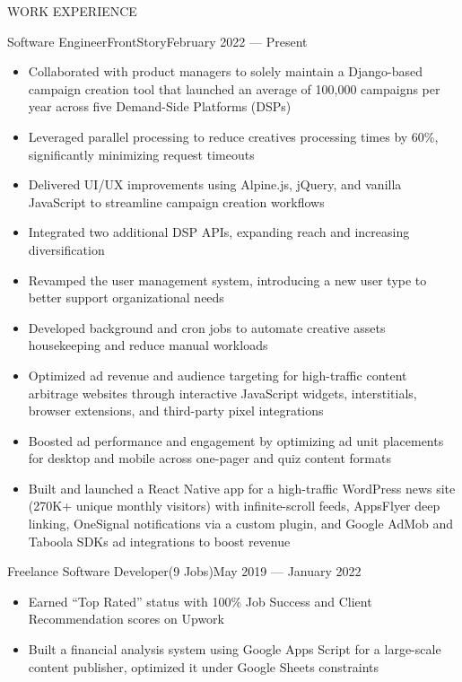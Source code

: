 \documentclass[]{mcdowellcv}
\begin{document}
	\makeheader
	
	
	\begin{cvsection}{WORK EXPERIENCE}
		\begin{cvsubsection}{Software Engineer}{FrontStory}{February 2022 — Present}
			\begin{itemize}
				\item Collaborated with product managers to solely maintain a Django-based campaign creation tool that launched an average of 100,000 campaigns per year across five Demand-Side Platforms (DSPs)
				\item Leveraged parallel processing to reduce creatives processing times by 60\%, significantly minimizing request timeouts
				\item Delivered UI/UX improvements using Alpine.js, jQuery, and vanilla JavaScript to streamline campaign creation workflows
				\item Integrated two additional DSP APIs, expanding reach and increasing diversification
				\item Revamped the user management system, introducing a new user type to better support organizational needs
				\item Developed background and cron jobs to automate creative assets housekeeping and reduce manual workloads
				\item Optimized ad revenue and audience targeting for high-traffic content arbitrage websites through interactive JavaScript widgets, interstitials, browser extensions, and third-party pixel integrations
				\item Boosted ad performance and engagement by optimizing ad unit placements for desktop and mobile across one-pager and quiz content formats
				\item Built and launched a React Native app for a high-traffic WordPress news site (270K+ unique monthly visitors) with infinite-scroll feeds, AppsFlyer deep linking, OneSignal notifications via a custom plugin, and Google AdMob and Taboola SDKs ad integrations to boost revenue
			\end{itemize}
		\end{cvsubsection}
		\begin{cvsubsection}{Freelance Software Developer}{(9 Jobs)}{May 2019 — January 2022}
			\begin{itemize}
				\item Earned “Top Rated” status with 100\% Job Success and Client Recommendation scores on Upwork
				\item Built a financial analysis system using Google Apps Script for a large-scale content publisher, optimized it under Google Sheets constraints
			\end{itemize}
		\end{cvsubsection}
	\end{cvsection}
	
\end{document}

